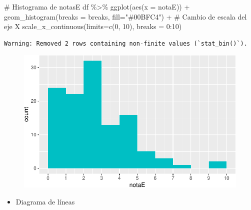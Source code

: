 \documentclass[
  a4paper,
]{scrreport}
\newenvironment{Shaded}{\begin{snugshade}}{\end{snugshade}}
\newcommand{\AttributeTok}[1]{\textcolor[rgb]{0.40,0.45,0.13}{#1}}
\newcommand{\CommentTok}[1]{\textcolor[rgb]{0.37,0.37,0.37}{#1}}
\newcommand{\DecValTok}[1]{\textcolor[rgb]{0.68,0.00,0.00}{#1}}
\newcommand{\FunctionTok}[1]{\textcolor[rgb]{0.28,0.35,0.67}{#1}}
\newcommand{\NormalTok}[1]{\textcolor[rgb]{0.00,0.23,0.31}{#1}}
\newcommand{\SpecialCharTok}[1]{\textcolor[rgb]{0.37,0.37,0.37}{#1}}
\newcommand{\StringTok}[1]{\textcolor[rgb]{0.13,0.47,0.30}{#1}}
\providecommand{\tightlist}{%
  \setlength{\itemsep}{0pt}\setlength{\parskip}{0pt}}\usepackage{longtable,booktabs,array}
\theoremstyle{definition}
\theoremstyle{definition}
\theoremstyle{remark}
\begin{document}
\begin{Shaded}
\begin{Highlighting}[]
\CommentTok{\# Histograma de notasE}
\NormalTok{df }\SpecialCharTok{\%\textgreater{}\%} \FunctionTok{ggplot}\NormalTok{(}\FunctionTok{aes}\NormalTok{(}\AttributeTok{x =}\NormalTok{ notaE)) }\SpecialCharTok{+} 
  \FunctionTok{geom\_histogram}\NormalTok{(}\AttributeTok{breaks =}\NormalTok{ breaks, }\AttributeTok{fill=}\StringTok{"\#00BFC4"}\NormalTok{) }\SpecialCharTok{+} 
  \CommentTok{\# Cambio de escala del eje X}
  \FunctionTok{scale\_x\_continuous}\NormalTok{(}\AttributeTok{limits=}\FunctionTok{c}\NormalTok{(}\DecValTok{0}\NormalTok{, }\DecValTok{10}\NormalTok{), }\AttributeTok{breaks =} \DecValTok{0}\SpecialCharTok{:}\DecValTok{10}\NormalTok{) }
\end{Highlighting}
\end{Shaded}

\begin{verbatim}
Warning: Removed 2 rows containing non-finite values (`stat_bin()`).
\end{verbatim}

\begin{figure}[H]

{\centering \includegraphics{./08-analisis-estadisticos_files/figure-pdf/unnamed-chunk-12-1.pdf}

}

\end{figure}

\begin{itemize}
\tightlist
\item
  Diagrama de líneas
\end{itemize}
\end{document}
